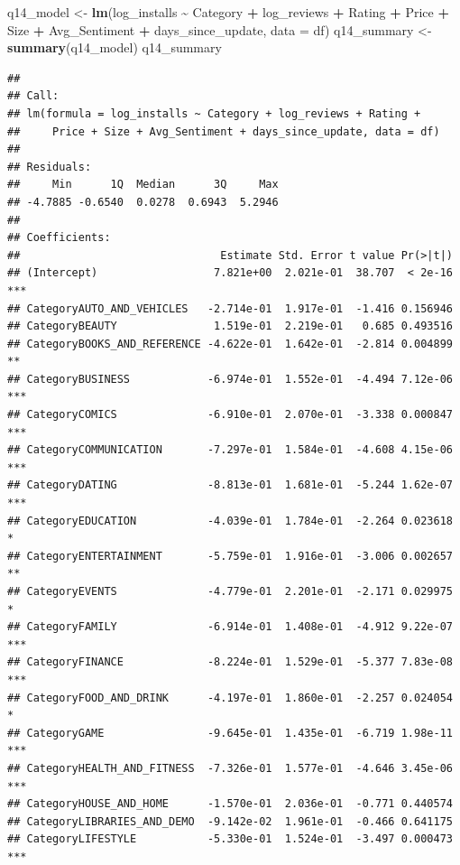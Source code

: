 \documentclass[
]{article}
\newenvironment{Shaded}{\begin{snugshade}}{\end{snugshade}}
\newcommand{\AttributeTok}[1]{\textcolor[rgb]{0.13,0.29,0.53}{#1}}
\newcommand{\FunctionTok}[1]{\textcolor[rgb]{0.13,0.29,0.53}{\textbf{#1}}}
\newcommand{\NormalTok}[1]{#1}
\newcommand{\OtherTok}[1]{\textcolor[rgb]{0.56,0.35,0.01}{#1}}
\newcommand{\SpecialCharTok}[1]{\textcolor[rgb]{0.81,0.36,0.00}{\textbf{#1}}}
\begin{document}
\begin{Shaded}
\begin{Highlighting}[]
\NormalTok{q14\_model }\OtherTok{\textless{}{-}} \FunctionTok{lm}\NormalTok{(log\_installs }\SpecialCharTok{\textasciitilde{}}\NormalTok{ Category }\SpecialCharTok{+}\NormalTok{ log\_reviews }\SpecialCharTok{+}\NormalTok{ Rating }\SpecialCharTok{+}\NormalTok{ Price }\SpecialCharTok{+}\NormalTok{ Size }\SpecialCharTok{+}\NormalTok{ Avg\_Sentiment }\SpecialCharTok{+}\NormalTok{ days\_since\_update, }\AttributeTok{data =}\NormalTok{ df)}
\NormalTok{q14\_summary }\OtherTok{\textless{}{-}} \FunctionTok{summary}\NormalTok{(q14\_model)}
\NormalTok{q14\_summary}
\end{Highlighting}
\end{Shaded}

\begin{verbatim}
## 
## Call:
## lm(formula = log_installs ~ Category + log_reviews + Rating + 
##     Price + Size + Avg_Sentiment + days_since_update, data = df)
## 
## Residuals:
##     Min      1Q  Median      3Q     Max 
## -4.7885 -0.6540  0.0278  0.6943  5.2946 
## 
## Coefficients:
##                               Estimate Std. Error t value Pr(>|t|)    
## (Intercept)                  7.821e+00  2.021e-01  38.707  < 2e-16 ***
## CategoryAUTO_AND_VEHICLES   -2.714e-01  1.917e-01  -1.416 0.156946    
## CategoryBEAUTY               1.519e-01  2.219e-01   0.685 0.493516    
## CategoryBOOKS_AND_REFERENCE -4.622e-01  1.642e-01  -2.814 0.004899 ** 
## CategoryBUSINESS            -6.974e-01  1.552e-01  -4.494 7.12e-06 ***
## CategoryCOMICS              -6.910e-01  2.070e-01  -3.338 0.000847 ***
## CategoryCOMMUNICATION       -7.297e-01  1.584e-01  -4.608 4.15e-06 ***
## CategoryDATING              -8.813e-01  1.681e-01  -5.244 1.62e-07 ***
## CategoryEDUCATION           -4.039e-01  1.784e-01  -2.264 0.023618 *  
## CategoryENTERTAINMENT       -5.759e-01  1.916e-01  -3.006 0.002657 ** 
## CategoryEVENTS              -4.779e-01  2.201e-01  -2.171 0.029975 *  
## CategoryFAMILY              -6.914e-01  1.408e-01  -4.912 9.22e-07 ***
## CategoryFINANCE             -8.224e-01  1.529e-01  -5.377 7.83e-08 ***
## CategoryFOOD_AND_DRINK      -4.197e-01  1.860e-01  -2.257 0.024054 *  
## CategoryGAME                -9.645e-01  1.435e-01  -6.719 1.98e-11 ***
## CategoryHEALTH_AND_FITNESS  -7.326e-01  1.577e-01  -4.646 3.45e-06 ***
## CategoryHOUSE_AND_HOME      -1.570e-01  2.036e-01  -0.771 0.440574    
## CategoryLIBRARIES_AND_DEMO  -9.142e-02  1.961e-01  -0.466 0.641175    
## CategoryLIFESTYLE           -5.330e-01  1.524e-01  -3.497 0.000473 ***

\end{verbatim}
\end{document}
